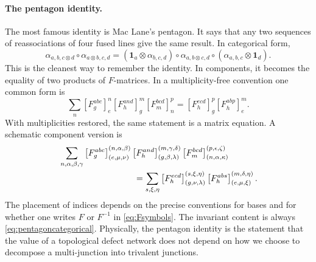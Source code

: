 \documentclass[11pt]{article}
\newcommand{\id}{\mathbf{1}}
\begin{document}
\paragraph{The pentagon identity.}
The most famous identity is Mac Lane's pentagon.  It says that any two sequences of reassociations of four fused lines give the same result.  In categorical form,
\begin{equation}
  \alpha_{a,b,c\otimes d}\circ \alpha_{a\otimes b,c,d}
  =
  (\id_a\otimes \alpha_{b,c,d})\circ \alpha_{a,b\otimes c,d}\circ(\alpha_{a,b,c}\otimes \id_d) .
  \label{eq:pentagoncategorical}
\end{equation}
This is the cleanest way to remember the identity.  In components, it becomes the equality of two products of $F$-matrices.  In a multiplicity-free convention one common form is
\begin{equation}
  \sum_n
  \left[F^{abc}_{g}\right]_{e}^{n}
  \left[F^{a n d}_{h}\right]_{g}^{m}
  \left[F^{bcd}_{m}\right]_{n}^{p}
  =
  \left[F^{e c d}_{h}\right]_{g}^{p}
  \left[F^{a b p}_{h}\right]_{e}^{m} .
  \label{eq:pentagonmultiplicityfree}
\end{equation}
With multiplicities restored, the same statement is a matrix equation.  A schematic component version is
\begin{equation}
\begin{aligned}
&\sum_{n,\alpha,\beta,\gamma}
\left[F^{abc}_{g}\right]_{(e,\mu,\nu)}^{(n,\alpha,\beta)}
\left[F^{a n d}_{h}\right]_{(g,\beta,\lambda)}^{(m,\gamma,\delta)}
\left[F^{b c d}_{m}\right]_{(n,\alpha,\kappa)}^{(p,\epsilon,\zeta)} \\
&\hspace{3.1cm}=
\sum_{s,\xi,\eta}
\left[F^{e c d}_{h}\right]_{(g,\nu,\lambda)}^{(s,\xi,\eta)}
\left[F^{a b s}_{h}\right]_{(e,\mu,\xi)}^{(m,\delta,\eta)} .
\end{aligned}
\label{eq:pentagonwithmultiplicity}
\end{equation}
The placement of indices depends on the precise conventions for bases and for whether one writes $F$ or $F^{-1}$ in \eqref{eq:Fsymbols}.  The invariant content is always \eqref{eq:pentagoncategorical}.  Physically, the pentagon identity is the statement that the value of a topological defect network does not depend on how we choose to decompose a multi-junction into trivalent junctions.
\end{document}
